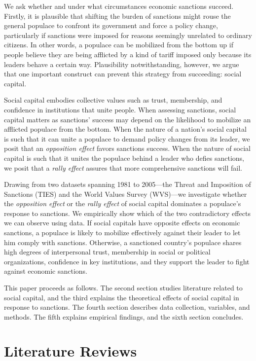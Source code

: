 \documentclass[
  english,
  man]{apa6}
\begin{document}
We ask whether and under what circumstances economic sanctions succeed. Firstly, it is plausible that shifting the burden of sanctions might rouse the general populace to confront its government and force a policy change, particularly if sanctions were imposed for reasons seemingly unrelated to ordinary citizens. In other words, a populace can be mobilized from the bottom up if people believe they are being afflicted by a kind of tariff imposed only because its leaders behave a certain way. Plausibility notwithstanding, however, we argue that one important construct can prevent this strategy from succeeding: social capital.

Social capital embodies collective values such as trust, membership, and confidence in institutions that unite people. When assessing sanctions, social capital matters as sanctions' success may depend on the likelihood to mobilize an afflicted populace from the bottom. When the nature of a nation's social capital is such that it can unite a populace to demand policy changes from its leader, we posit that an \emph{opposition effect} favors sanctions success. When the nature of social capital is such that it unites the populace behind a leader who defies sanctions, we posit that a \emph{rally effect} assures that more comprehensive sanctions will fail.

Drawing from two datasets spanning 1981 to 2005---the Threat and Imposition of Sanctions (TIES) and the World Values Survey (WVS)---we investigate whether the \emph{opposition effect} or the \emph{rally effect} of social capital dominates a populace's response to sanctions. We empirically show which of the two contradictory effects we can observe using data. If social capitals have opposite effects on economic sanctions, a populace is likely to mobilize effectively against their leader to let him comply with sanctions. Otherwise, a sanctioned country's populace shares high degrees of interpersonal trust, membership in social or political organizations, confidence in key institutions, and they support the leader to fight against economic sanctions.

This paper proceeds as follows. The second section studies literature related to social capital, and the third explains the theoretical effects of social capital in response to sanctions. The fourth section describes data collection, variables, and methods. The fifth explains empirical findings, and the sixth section concludes.

\hypertarget{literature-reviews}{%
\section{Literature Reviews}\label{literature-reviews}}
\end{document}
